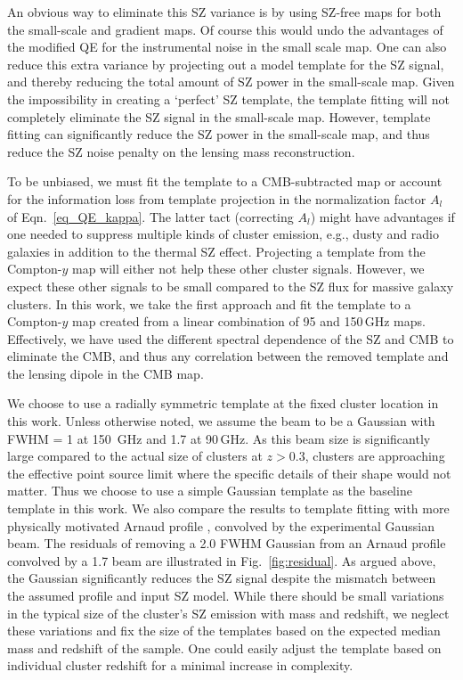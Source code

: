 An obvious way to eliminate this SZ variance is by using SZ-free maps for both the small-scale and gradient maps. 
Of course this would undo the advantages of the modified QE for the instrumental noise in the small scale map. 
One can also reduce this extra variance by projecting out a model template for the SZ signal, and thereby reducing the total amount of SZ power in the small-scale map. 
Given the impossibility in creating a `perfect' SZ template, the template fitting will not completely eliminate the SZ signal in the small-scale map. 
However, template fitting can significantly reduce the SZ power in the small-scale map, and thus reduce the SZ noise penalty on the lensing mass reconstruction. 



To be unbiased, we must fit the template to a CMB-subtracted map or account for the information loss from template projection in the normalization factor $A_l$ of Eqn.~\ref{eq_QE_kappa}. 
The latter tact (correcting $A_l$) might have advantages if one needed to suppress multiple kinds of cluster emission, e.g., dusty and radio galaxies in addition to the thermal SZ effect. 
Projecting a template from the Compton-$y$ map will either not help these other cluster signals. 
However, we expect these other signals to be small compared to the SZ flux for massive galaxy clusters. %
In this work, we take the first approach and fit the template to a Compton-$y$ map created from a linear combination of 95 and 150\,GHz maps. 
Effectively, we have used the different spectral dependence of the SZ and CMB to eliminate the CMB, and thus any correlation between the removed template and the lensing dipole in the CMB map. 


We choose to use a radially symmetric template at the fixed cluster location in this work. 
Unless otherwise noted, we assume the beam to be a Gaussian with FWHM = 1\arcmin{} at 150\, GHz and 1\arcmin.7 at 90\,GHz. 
As this beam size is significantly large compared to the actual size of clusters at $z>0.3$, clusters are approaching the effective point source limit where the specific details of their shape would not matter. 
Thus we choose to use a simple Gaussian template as the baseline template in this work. 
We also compare the results to template fitting with more physically motivated Arnaud profile \citep{arnaud10}, convolved by the experimental Gaussian beam.  
The residuals of removing a 2\arcmin.0 FWHM Gaussian from an Arnaud profile convolved by a 1\arcmin.7 beam are illustrated in Fig.~\ref{fig:residual}. 
As argued above, the Gaussian significantly reduces the SZ signal despite the mismatch between the assumed profile and input SZ model. 
While there should be small variations in the typical size of the cluster's SZ emission with mass and redshift, we neglect these variations and fix the size of the templates based on the expected median mass and redshift of the sample. 
One could easily adjust the template based on individual cluster redshift for a minimal increase in complexity.



